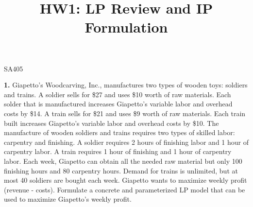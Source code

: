 \documentclass[11pt]{article}
\makeatletter
\theoremstyle{definition}
\renewcommand{\maketitle}{
  \noindent SA405 

  \begin{center}\Large{\textbf{\@title}}\end{center}
}
\makeatother
\begin{document}
\title{HW1: LP Review and IP Formulation}


\maketitle

\textbf{1.} Giapetto’s Woodcarving, Inc., manufactures two types of wooden toys: soldiers and trains. A soldier sells for \$27 and uses \$10 worth of raw materials. Each solder that is manufactured increases Giapetto’s variable labor and overhead costs by \$14. A train sells for \$21 and uses \$9 worth of raw materials. Each train built increases Giapetto’s variable labor and overhead costs by \$10. The manufacture of wooden soldiers and trains requires two types of skilled labor: carpentry and finishing. A soldier requires 2 hours of finishing labor and 1 hour of carpentry labor. A train requires 1 hour of finishing and 1 hour of carpentry labor. Each week, Giapetto can obtain all the needed raw material but only 100 finishing hours and 80 carpentry hours. Demand for trains is unlimited, but at most 40 soldiers are bought each week. Giapetto wants to maximize weekly profit (revenue - costs). Formulate a concrete and parameterized LP model that can be used to maximize Giapetto’s weekly profit.
\end{document}
